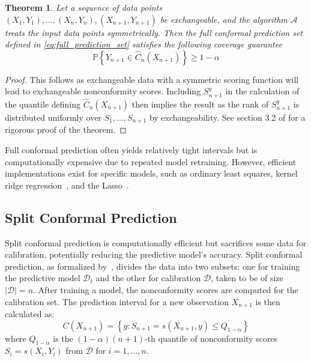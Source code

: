 \documentclass{article}
\newtheorem{theorem}{Theorem}
\theoremstyle{definition}
\newcommand{\todo}{{\color{blue}TODO: }}
\begin{document}
\begin{theorem}\label{th:full-conformal}
Let a sequence of data points $(X_1, Y_1), \dots, (X_n, Y_n), (X_{n+1}, Y_{n+1})$ be exchangeable, and the algorithm $\mathcal{A}$ treats the input data points symmetrically. Then the full conformal prediction set defined in \eqref{eq:full_prediction_set} satisfies the following coverage guarantee
$$
\mathbb{P}\left\{ Y_{n+1} \in \widehat{C}_n(X_{n+1}) \right\} \geq 1 - \alpha %
$$
\end{theorem}
\begin{proof} This follows as exchangeable data with a symmetric scoring function will lead to exchangeable nonconformity scores. Including $S_{n+1}^y$ in the calculation of the quantile defining $\widehat{C}_n(X_{n+1})$ then implies the result as the rank of $S_{n+1}^y$ is distributed uniformly over $S_1, ..., S_{n+1}$ by exchangeability. See section 3.2 of \cite{angelopoulos2024theoretical-foundations-cp} for a rigorous proof of the theorem.

\end{proof}

Full conformal prediction often yields relatively tight intervals but is computationally expensive due to repeated model retraining. However, efficient implementations exist for specific models, such as ordinary least squares, kernel ridge regression~\cite{burnaev2014}, and the Lasso~\cite{lei2019}. 

\subsection{Split Conformal Prediction}

Split conformal prediction is computationally efficient but sacrifices some data for calibration, potentially reducing the predictive model's accuracy. Split conformal prediction, as formalized by~\cite{vovk2022algorithmic}, divides the data into two subsets: one for training the predictive model $\mathcal{D}_t$ and the other for calibration $\mathcal{D}$, taken to be of size $|\mathcal{D}| = n$. After training a model, the nonconformity scores are computed for the calibration set. The prediction interval for a new observation $X_{n+1}$ is then calculated as:
\begin{equation} \label{eq:split_conformal}
    C(X_{n+1}) = \left\{y : S_{n+1} = s(X_{n+1}, y) \le Q_{1-\alpha}\right\}
\end{equation}
where $Q_{1-\alpha}$ is the $(1-\alpha)(n+1)$-th quantile of  nonconformity scores $S_i = s(X_i, Y_i)$ from $\mathcal{D}$ for $i=1, ..., n$.
\end{document}
